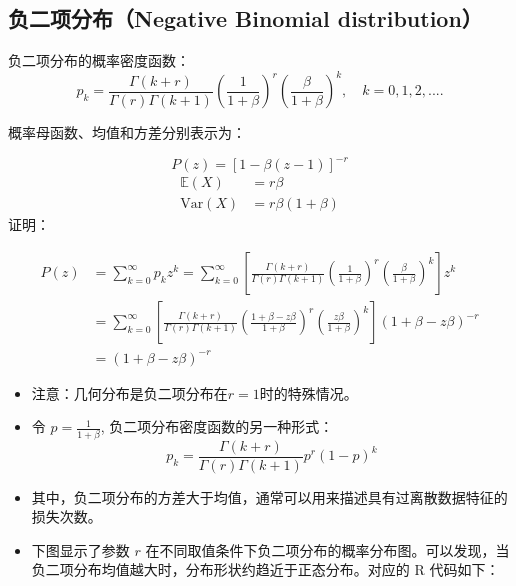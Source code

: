 \documentclass[
]{book}
\begin{document}
\hypertarget{ux8d1fux4e8cux9879ux5206ux5e03negative-binomial-distribution}{%
\subsection{负二项分布（Negative Binomial distribution）}\label{ux8d1fux4e8cux9879ux5206ux5e03negative-binomial-distribution}}

负二项分布的概率密度函数：
\[
{{p}_{k}}=\frac{\Gamma (k+r)}{\Gamma (r)\Gamma (k+1)}{{\left( \frac{1}{1+\beta } \right)}^{r}}{{\left( \frac{\beta }{1+\beta } \right)}^{k}}, \quad k=0,1,2,....
\]

概率母函数、均值和方差分别表示为：

\[
P(z)={{\left[ 1-\beta (z-1) \right]}^{-r}}
\]
\[
\begin{align*}
\mathbb{E}(X)&=r\beta\\
\text{Var}(X)&=r\beta(1+\beta)
\end{align*}
\]
证明：

\[
\begin{align*}
  P(z)&=\sum\limits_{k=0}^{\infty }{{{p}_{k}}{{z}^{k}}}=\sum\limits_{k=0}^{\infty }{\left[ \frac{\Gamma (k+r)}{\Gamma (r)\Gamma (k+1)}{{\left( \frac{1}{1+\beta } \right)}^{r}}{{\left( \frac{\beta }{1+\beta } \right)}^{k}} \right]{{z}^{k}}} \\ 
 & =\sum\limits_{k=0}^{\infty }{\left[ \frac{\Gamma (k+r)}{\Gamma (r)\Gamma (k+1)}{{\left( \frac{1+\beta -z\beta }{1+\beta } \right)}^{r}}{{\left( \frac{z\beta }{1+\beta } \right)}^{k}} \right]}{{\left( 1+\beta -z\beta  \right)}^{-r}} \\ 
 & ={{\left( 1+\beta -z\beta  \right)}^{-r}}
\end{align*} 
\]

\begin{itemize}
\item
  注意：几何分布是负二项分布在\(r=1\)时的特殊情况。
\item
  令 \(p=\frac{1}{1+\beta}\), 负二项分布密度函数的另一种形式：
  \[
  {{p}_{k}}=\frac{\Gamma (k+r)}{\Gamma (r)\Gamma (k+1)}{{p}^{r}}{{\left( 1-p \right)}^{k}}
  \]
\item
  其中，负二项分布的方差大于均值，通常可以用来描述具有过离散数据特征的损失次数。
\item
  下图显示了参数 \(r\) 在不同取值条件下负二项分布的概率分布图。可以发现，当负二项分布均值越大时，分布形状约趋近于正态分布。对应的 R 代码如下：
\end{itemize}
\end{document}
